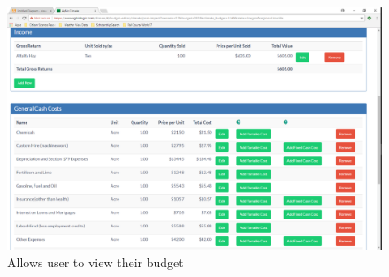 \documentclass[onecolumn, draftclsnofoot,10pt, compsoc]{article}
\begin{document}
	\begin{figure}[h]
		\includegraphics[width=\linewidth]{Figures/BudgetReivew.eps}
		\caption{Allows user to view their budget}
		\label{figure3.5}
	\end{figure}
\end{document}
